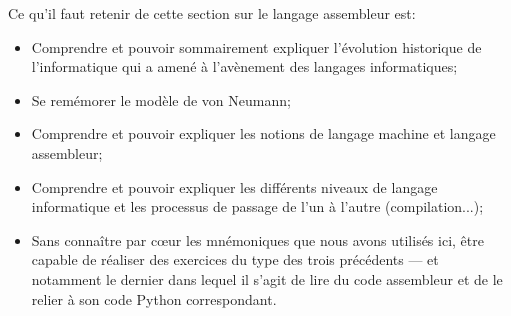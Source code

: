 \documentclass[12pt]{article}
\begin{document}
 	\begin{MonRet}
	 	Ce qu'il faut retenir de cette section sur le langage assembleur est:
	 	\begin{itemize}
	 		\item Comprendre et pouvoir sommairement expliquer l'évolution historique de l'informatique qui a amené à l'avènement des langages informatiques;
	 		\item Se remémorer le modèle de von Neumann;
	 		\item Comprendre et pouvoir expliquer les notions de langage machine et langage assembleur;
	 		\item Comprendre et pouvoir expliquer les différents niveaux de langage informatique et les processus de passage de l'un à l'autre (compilation...);
	 		\item Sans connaître par cœur les mnémoniques que nous avons utilisés ici, être capable de réaliser des exercices du type des trois précédents --- et notamment le dernier dans lequel il s'agit de lire du code assembleur et de le relier à son code Python correspondant.
	 	\end{itemize}
		\end{MonRet}
	 
\end{document}
